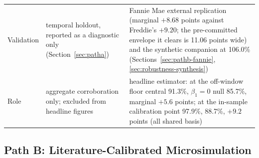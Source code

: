\documentclass[12pt]{article}
\begin{document}
\begin{table}[H]
\begin{threeparttable}
\begin{tabular}{@{}p{2.2cm}p{5.9cm}p{5.9cm}@{}}
Validation & temporal holdout, reported as a diagnostic only (Section~\ref{sec:patha}) & Fannie Mae external replication (marginal $+8.68$ points against Freddie's $+9.20$; the pre-committed envelope it clears is 11.06 points wide) and the synthetic companion at 106.0\% (Sections~\ref{sec:pathb-fannie}, \ref{sec:robustness-synthesis}) \\
Role & aggregate corroboration only; excluded from headline figures & headline estimator: at the off-window floor central 91.3\%, $\beta_1 = 0$ null 85.7\%, marginal $+5.6$ points; at the in-sample calibration point 97.9\%, 88.7\%, $+9.2$ points (all shared basis) \\
\bottomrule
\end{tabular}
\end{threeparttable}
\end{table}

\subsection{Path B: Literature-Calibrated Microsimulation}\label{sec:pathb}
\end{document}
